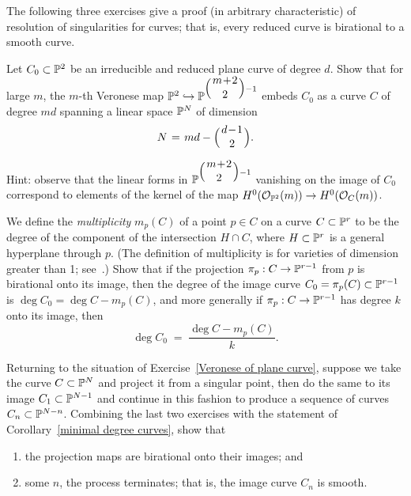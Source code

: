 The following three exercises give a proof (in arbitrary characteristic) of resolution of singularities for curves; that is, every reduced curve is birational to a smooth curve.


\begin{exercise}\label{Veronese of plane curve}
Let $C_0 \subset \mathbb P^2$ be an irreducible and reduced plane curve of degree $d$. Show that for large $m$, the $m$-th Veronese map $\PP^2 \hookrightarrow \PP^{\binom{m+2}{2} - 1}$ embeds $C_0$ as a curve $C$ of degree $md$ spanning a linear space $\mathbb P^N$ of dimension
$$
N \; = \; md - \mbinom{d-1}{2}.
$$

Hint: observe that the linear forms in $\PP^{\binom{m+2}{2} - 1}$ vanishing on the image of $C_0$ correspond to elements of the kernel of the map $H^0({\mathcal O}_{\mathbb P^2}(m)) \to H^0({\mathcal O}_{C}(m))$.
\end{exercise}


\begin{exercise}
We define the \emph{multiplicity} $m_p(C)$ of a point $p \in C$ on a
%
curve $C \subset \mathbb P^r$ to be the degree of the component of the
intersection $H \cap C$, where $H \subset \mathbb P^r$ is a general
hyperplane through $p$. (The 
definition of multiplicity is
for varieties of dimension greater than 1;
see~\cite{3264}.) 
Show that if the projection $\pi_p : C \to \mathbb P^{r-1}$ from $p$ is
birational onto its image, then the degree of the image curve $C_0 =
\pi_p(C) \subset \mathbb P^{r-1}$ is $\deg C_0 = \deg C - m_p(C)$, and more
generally if $\pi_p : C \to \mathbb P^{r-1}$ has degree $k$ onto its image, then
$$
\deg C_0 \; = \; \frac{\deg C - m_p(C)}{k}.
$$
\end{exercise}


\begin{exercise}\label{Mumford resolution argument}
Returning to the situation of Exercise~\ref{Veronese of plane curve}, suppose we take the curve $C \subset \mathbb P^N$ and project it from a singular point, then do the same to its image $C_1 \subset \mathbb P^{N-1}$ and continue in this fashion to produce a sequence of curves $C_n \subset \mathbb P^{N-n}$. Combining the last two exercises with the statement of Corollary~\ref{minimal degree curves}, show that
\begin{enumerate}
\item 
{}
the projection maps are birational onto their images; and
\item 
{}
some $n$, the process terminates; that is, the image curve $C_n$ is smooth.
\end{enumerate}
\end{exercise}

 